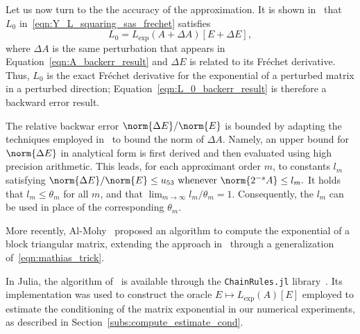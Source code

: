 Let us now turn to the the accuracy of the approximation. It is shown in~\cite[Thm.~6.3]{higham:alhi09} that $L_0$ in~\eqref{eqn:Y_L_squaring_sas_frechet} satisfies
\begin{equation}\label{eqn:L_0_backerr_result}
	L_0=L_{\exp}(A+\Delta{A})[E+\Delta{E}],
\end{equation}
where $\Delta{A}$ is the same perturbation that appears in Equation~\eqref{eqn:A_backerr_result} and $\Delta{E}$ is related to its Fréchet derivative. Thus, $L_0$ is the exact Fréchet derivative for the exponential of a perturbed matrix in a perturbed direction; Equation~\eqref{eqn:L_0_backerr_result} is therefore a backward error result. 

The relative backwar error $\norm{\Delta{E}}/\norm{E}$ is bounded by adapting the techniques employed in~\cite{higham:SaS_revisited} to bound the norm of $\Delta{A}$. Namely, an upper bound for $\norm{\Delta{E}}$ in analytical form is first derived and then evaluated using high precision arithmetic. This leads, for each approximant order $m$, to constants $l_m$ satisfying 
$
	\norm{\Delta{E}}/\norm{E}\le u_{53}\ \text{whenever } \norm{2^{-s}A}\le l_m.
$
It holds that $l_m\le\theta_m$ for all $m$, and that $\lim_{m\to\infty}l_m/\theta_m=1$. Consequently, the $l_m$ can be used in place of the corresponding $\theta_m$.
\smallskip 

More recently, Al-Mohy~\cite{almohy:expm_tri_25} proposed an algorithm to compute the exponential of a block triangular matrix, extending the approach in~\cite{higham:alhi09} through a generalization of~\eqref{eqn:mathias_trick}.
\medskip 

In Julia, the algorithm of~\cite{higham:alhi09} is available through the \texttt{ChainRules.jl} library~\cite{sw:ChainRules}. Its implementation was used to construct the oracle $E\mapsto L_{\exp}(A)[E]$ employed to estimate the conditioning of the matrix exponential in our numerical experiments, as described in Section~\ref{subs:compute_estimate_cond}. 

















